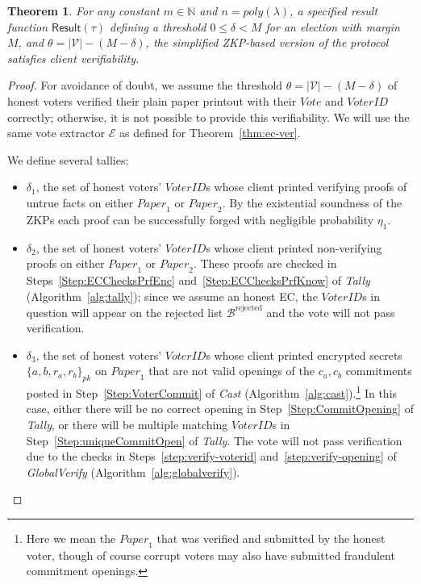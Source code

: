 \documentclass[12pt,a4paper]{article}
\newtheorem{theorem}{Theorem}
\theoremstyle{definition}
\newcommand{\Vote}{\mathit{Vote}}
\newcommand{\VoterID}{\mathit{VoterID}}
\newcommand{\Paper}{\mathit{Paper}}
\begin{document}
\begin{theorem}
    For any constant $m\in\mathbb{N}$ and $n=poly(\lambda)$, a specified result function $\mathsf{Result}(\tau)$ defining a threshold $0 \leq \delta < M$ for an election with margin $M$, and $\theta=|\mathcal{V}|-(M-\delta)$, the simplified ZKP-based version of the protocol satisfies client verifiability.
\end{theorem}
\begin{proof}
    For avoidance of doubt, we assume the threshold $\theta=|\mathcal{V}|-(M-\delta)$ of honest voters verified their plain paper printout with their $\Vote$ and $\VoterID$ correctly; otherwise, it is not possible to provide this verifiability. We will use the same vote extractor $\mathcal{E}$ as defined for Theorem~\ref{thm:ec-ver}.

    We define several tallies:
    \begin{itemize}
        \item $\delta_1$, the set of honest voters' $\VoterID$s whose client printed verifying proofs of untrue facts on either $\Paper_1$ or $\Paper_2$. By the existential soundness of the ZKPs each proof can be successfully forged with negligible probability $\eta_1$.

        \item $\delta_2$, the set of honest voters' $\VoterID$s whose client printed non-verifying proofs on either $\Paper_1$ or $\Paper_2$. These proofs are checked in Steps~\ref{Step:ECChecksPrfEnc} and~\ref{Step:ECChecksPrfKnow} of \textit{Tally} (Algorithm~\ref{alg:tally}); since we assume an honest EC, the $\VoterID$s in question will appear on the rejected list $\mathcal{B}^{\text{rejected}}$ and the vote will not pass verification.

        \item $\delta_3$, the set of honest voters' $\VoterID$s whose client printed encrypted secrets $\{a, b, r_a, r_b\}_{pk}$ on $\Paper_1$ that are not valid openings of the $c_a, c_b$ commitments posted in Step~\ref{Step:VoterCommit} of \textit{Cast} (Algorithm~\ref{alg:cast}).\footnote{Here we mean the $\Paper_1$ that was verified and submitted by the honest voter, though of course corrupt voters may also have submitted fraudulent commitment openings.} In this case, either there will be no correct opening in Step~\ref{Step:CommitOpening} of \textit{Tally}, or there will be multiple matching $\VoterID$s in Step~\ref{Step:uniqueCommitOpen} of \textit{Tally}. The vote will not pass verification due to the checks in Steps~\ref{step:verify-voterid} and~\ref{step:verify-opening} of \textit{GlobalVerify} (Algorithm~\ref{alg:globalverify}).


\end{itemize}
\end{proof}
\end{document}
